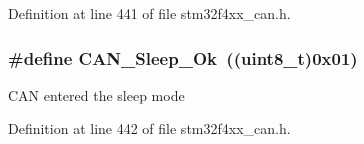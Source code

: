 Definition at line 441 of file stm32f4xx\-\_\-can.\-h.

\hypertarget{group___c_a_n__sleep__constants_gaf5c4e9d32d4faff9d0bf61e153ed7998}{
\subsubsection[{C\-A\-N\-\_\-\-Sleep\-\_\-\-Ok}]{\setlength{\rightskip}{0pt plus 5cm}\#define C\-A\-N\-\_\-\-Sleep\-\_\-\-Ok~((uint8\-\_\-t)0x01)}}\label{group___c_a_n__sleep__constants_gaf5c4e9d32d4faff9d0bf61e153ed7998}
C\-A\-N entered the sleep mode 

Definition at line 442 of file stm32f4xx\-\_\-can.\-h.

